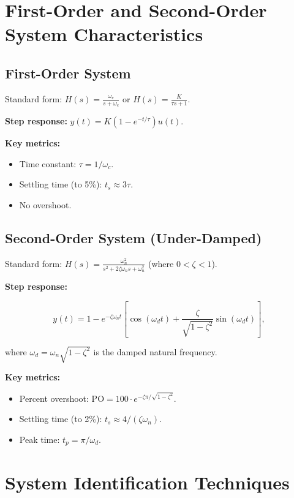 \documentclass[11pt,letterpaper]{article}
\begin{document}
\section{First-Order and Second-Order System Characteristics}

\subsection{First-Order System}

Standard form: $H(s) = \frac{\omega_c}{s + \omega_c}$ or $H(s) = \frac{K}{\tau s + 1}$.

\noindent
\textbf{Step response:} $y(t) = K(1 - e^{-t/\tau}) u(t)$.

\noindent
\textbf{Key metrics:}
\begin{itemize}
    \item Time constant: $\tau = 1/\omega_c$.
    \item Settling time (to 5\%): $t_s \approx 3\tau$.
    \item No overshoot.
\end{itemize}

\subsection{Second-Order System (Under-Damped)}

Standard form: $H(s) = \frac{\omega_n^2}{s^2 + 2\zeta \omega_n s + \omega_n^2}$ (where $0 < \zeta < 1$).

\noindent
\textbf{Step response:}

\begin{equation}
y(t) = 1 - e^{-\zeta \omega_n t} \left[\cos(\omega_d t) + \frac{\zeta}{\sqrt{1-\zeta^2}} \sin(\omega_d t)\right],
\end{equation}

\noindent
where $\omega_d = \omega_n \sqrt{1 - \zeta^2}$ is the damped natural frequency.

\noindent
\textbf{Key metrics:}
\begin{itemize}
    \item Percent overshoot: $\text{PO} = 100 \cdot e^{-\zeta \pi / \sqrt{1-\zeta^2}}$.
    \item Settling time (to 2\%): $t_s \approx 4 / (\zeta \omega_n)$.
    \item Peak time: $t_p = \pi / \omega_d$.
\end{itemize}

\section{System Identification Techniques}
\end{document}
